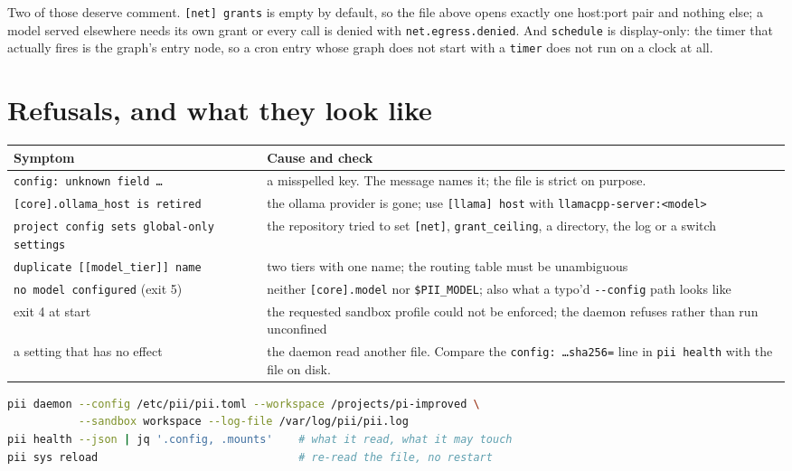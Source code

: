 Two of those deserve comment. \texttt{[net] grants} is empty by default, so the file above
opens exactly one host:port pair and nothing else; a model served elsewhere needs its own
grant or every call is denied with \texttt{net.egress.denied}. And \texttt{schedule} is
display-only: the timer that actually fires is the graph's entry node, so a cron entry whose
graph does not start with a \texttt{timer} does not run on a clock at all.

\section{Refusals, and what they look like}

\begin{center}
\begin{tabular}{@{}>{\raggedright\arraybackslash}p{}>{\raggedright\arraybackslash}p{}@{}}
  \toprule
  \textbf{Symptom} & \textbf{Cause and check} \\
  \midrule
  \texttt{config: unknown field \ldots} & a misspelled key. The message names it; the file is
    strict on purpose. \\
  \texttt{[core].ollama\_host is retired} & the ollama provider is gone; use
    \texttt{[llama] host} with \texttt{llamacpp-server:<model>} \\
  \texttt{project config sets global-only settings} & the repository tried to set
    \texttt{[net]}, \texttt{grant\_ceiling}, a directory, the log or a switch \\
  \texttt{duplicate [[model\_tier]] name} & two tiers with one name; the routing table must be
    unambiguous \\
  \texttt{no model configured} (exit 5) & neither \texttt{[core].model} nor
    \texttt{\$PII\_MODEL}; also what a typo'd \texttt{-{}-config} path looks like \\
  exit 4 at start & the requested sandbox profile could not be enforced; the daemon refuses
    rather than run unconfined \\
  a setting that has no effect & the daemon read another file. Compare the
    \texttt{config: \ldots sha256=} line in \texttt{pii health} with the file on disk. \\
  \bottomrule
\end{tabular}
\end{center}

\begin{lstlisting}[language=bash]
pii daemon --config /etc/pii/pii.toml --workspace /projects/pi-improved \
           --sandbox workspace --log-file /var/log/pii/pii.log
pii health --json | jq '.config, .mounts'    # what it read, what it may touch
pii sys reload                               # re-read the file, no restart
\end{lstlisting}